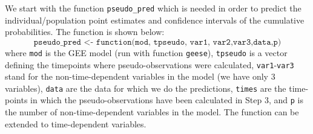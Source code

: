 \documentclass[a4paper,11pt]{article}\usepackage[]{graphicx}\usepackage[]{color}
\begin{document}
We start with the function \texttt{pseudo\_pred} which is needed in order to predict the individual/population point estimates and confidence intervals of the cumulative probabilities. The function is shown below:
\begin{equation*}
  \texttt{pseudo\_pred <- function(mod, tpseudo, var1, var2,var3,data,p)}
\end{equation*}
where \texttt{mod} is the GEE model (run with function \texttt{geese}), \texttt{tpseudo} is a vector defining the timepoints where pseudo-observations were calculated, \texttt{var1}-\texttt{var3} stand for the non-time-dependent variables in the model (we have only 3 variables), \texttt{data} are the data for which we do the predictions, \texttt{times} are the time-points in which the pseudo-observations have been calculated in Step 3, and \texttt{p} is the number of non-time-dependent variables in the model. The function can be extended to time-dependent variables. 
\end{document}
